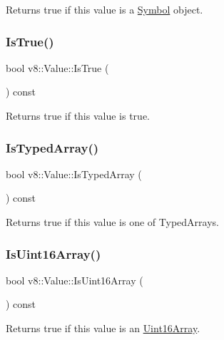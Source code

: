 Returns true if this value is a \mbox{\hyperlink{classv8_1_1Symbol}{Symbol}} object. \mbox{\label{classv8_1_1Value_a48c300598bad0155eb59965c9e6b86b6}} 
\subsubsection{\texorpdfstring{Is\+True()}{IsTrue()}}
{\footnotesize\ttfamily bool v8\+::\+Value\+::\+Is\+True (\begin{DoxyParamCaption}{ }\end{DoxyParamCaption}) const}

Returns true if this value is true. \mbox{\label{classv8_1_1Value_a01183cf30ba5e6383cdca82daee630d8}} 
\subsubsection{\texorpdfstring{Is\+Typed\+Array()}{IsTypedArray()}}
{\footnotesize\ttfamily bool v8\+::\+Value\+::\+Is\+Typed\+Array (\begin{DoxyParamCaption}{ }\end{DoxyParamCaption}) const}

Returns true if this value is one of Typed\+Arrays. \mbox{\label{classv8_1_1Value_af3e8da420ddc0f92aac5dbfe61ac9699}} 
\subsubsection{\texorpdfstring{Is\+Uint16\+Array()}{IsUint16Array()}}
{\footnotesize\ttfamily bool v8\+::\+Value\+::\+Is\+Uint16\+Array (\begin{DoxyParamCaption}{ }\end{DoxyParamCaption}) const}

Returns true if this value is an \mbox{\hyperlink{classv8_1_1Uint16Array}{Uint16\+Array}}. \mbox{\label{classv8_1_1Value_ae30d50fb96b03239bc90ceb07b6e46fc}} 
